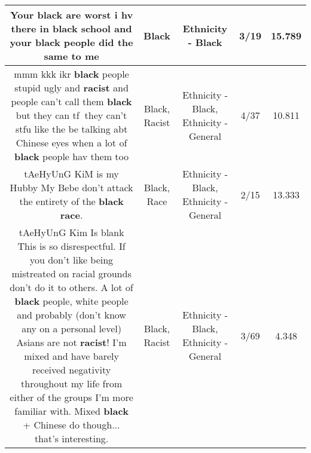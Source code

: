 \documentclass[11pt]{article}
\newlength\mylength
\begin{document}
\begin{center}
\begin{longtable}{|C{.65\mylength}|C{.30\mylength}|C{.12\mylength}|C{.12\mylength}|C{.12\mylength}|}
  \small Your \textbf{black} are worst i hv there in \textbf{black} school and your \textbf{black} people did the same to me\normalsize   & Black & Ethnicity - Black & 3/19 & 15.789 \\  \hline
  \small mmm kkk ikr \textbf{black} people stupid ugly and \textbf{racist} and people can't call them \textbf{black} but they can tf🤦‍♀️they can't stfu like the be talking abt Chinese eyes when a lot of \textbf{black} people hav them too\normalsize   & Black, Racist & Ethnicity - Black, Ethnicity - General & 4/37 & 10.811 \\  \hline
  \small tAeHyUnG KiM is my Hubby My Bebe don't attack the entirety of the \textbf{black} \textbf{race}.\normalsize   & Black, Race & Ethnicity - Black, Ethnicity - General & 2/15 & 13.333 \\  \hline
  \small tAeHyUnG Kim Is blank This is so disrespectful. If you don't like being mistreated on racial grounds don't do it to others. A lot of \textbf{black} people, white people and probably (don't know any on a personal level) Asians are not \textbf{racist}! I'm mixed and have barely received negativity throughout my life from either of the groups I'm more familiar with. Mixed \textbf{black} + Chinese do though... that's interesting.\normalsize   & Black, Racist & Ethnicity - Black, Ethnicity - General & 3/69 & 4.348 \\  \hline

\end{longtable}
\end{center}
\end{document}
